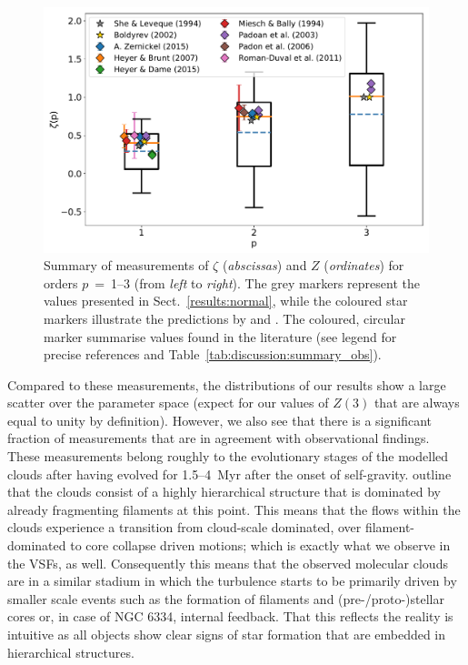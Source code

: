 \begin{figure}
	\includegraphics[width=\textwidth]{compare_observations.pdf}
	\caption{Summary of measurements of $\zeta$ (\textit{abscissas}) and $Z$ (\textit{ordinates}) for orders $p$~=~1--3 (from \textit{left} to \textit{right}). The grey markers represent the values presented in Sect.~\ref{results:normal}, while the coloured star markers illustrate the predictions by \citet{She1994} and \citet{Boldyrev2002}. The coloured, circular marker summarise values found in the literature (see legend for precise references and Table~\ref{tab:discussion:summary_obs}). 
	}
	\label{pic:discussion:comp_observation}
\end{figure}


Compared to these measurements, the distributions of our results show a large scatter over the parameter space (expect for our values of $Z(3)$ that are always equal to unity by definition). 
However, we also see that there is a significant fraction of measurements that are in agreement with observational findings. 
These measurements belong roughly to the evolutionary stages of the modelled clouds after having evolved for 1.5--4~Myr after the onset of self-gravity.
 outline that the clouds consist of a highly hierarchical structure that is dominated by already fragmenting filaments at this point.
This means that the flows within the clouds experience a transition from cloud-scale dominated, over filament-dominated to core collapse driven motions; which is exactly what we observe in the VSFs, as well.
Consequently this means that the observed molecular clouds are in a similar stadium in which the turbulence starts to be primarily driven by smaller scale events such as the formation of filaments and (pre-/proto-)stellar cores or, in case of NGC 6334, internal feedback.
That this reflects the reality is intuitive as all objects show clear signs of star formation that are embedded in hierarchical structures.

